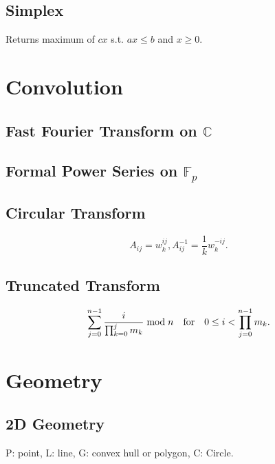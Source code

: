 \documentclass{article}
\begin{document}
\begin{multicols}{2}
    \subsection{Simplex}
    Returns maximum of $cx$ s.t. $ax\le b$ and $x\ge 0$.
    
    

    \section{Convolution}
    \subsection{Fast Fourier Transform on $\mathbb{C}$}
    
    \subsection{Formal Power Series on $\mathbb{F}_p$}
    
    
    \subsection{Circular Transform}
    $$A_{ij}=w_k^{ij}, A^{-1}_{ij}=\frac{1}{k}w_k^{-ij}.$$
    \subsection{Truncated Transform}
    $$\sum_{j=0}^{n-1}\frac{i}{\prod_{k=0}^{j}m_k}\bmod n\quad{\rm for}\quad 0\le i < \prod_{j=0}^{n-1}m_k.$$

    \section{Geometry}
    
    \subsection{2D Geometry}
    P: point, L: line, G: convex hull or polygon, C: Circle.
    

\end{multicols}
\end{document}

